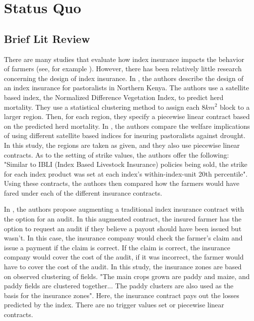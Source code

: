 \documentclass[11pt]{article}
\begin{document}
\section{Status Quo}
  \subsection{Brief Lit Review}
    There are many studies that evaluate how index insurance impacts the behavior of farmers (see, for example \cite{karlan2014agricultural}). However, there has been relatively little research concerning the design of index insurance. In \cite{chantarat2013designing}, the authors describe the design of an index insurance for pastoralists in Northern Kenya. The authors use a satellite based index, the Normalized Difference Vegetation Index, to predict herd mortality. They use a statistical clustering method to assign each $8km^2$ block to a larger region. Then, for each region, they specify a piecewise linear contract based on the predicted herd mortality. In \cite{jensen2019does}, the authors compare the welfare implications of using different satellite based indices for insuring pastoralists against drought. In this study, the regions are taken as given, and they also use piecewise linear contracts. As to the setting of strike values, the authors offer the following: "Similar to IBLI (Index Based Livestock Insurance) policies being sold, the strike for each index product was set at each index's within-index-unit 20th percentile". Using these contracts, the authors then compared how the farmers would have fared under each of the different insurance contracts. 
    
    In \cite{flatnes2018improving}, the authors propose augmenting a traditional index insurance contract with the option for an audit. In this augmented contract, the insured farmer has the option to request an audit if they believe a payout should have been issued but wasn't. In this case, the insurance company would check the farmer's claim and issue a payment if the claim is correct. If the claim is correct, the insurance company would cover the cost of the audit, if it was incorrect, the farmer would have to cover the cost of the audit. In this study, the insurance zones are based on observed clustering of fields. "The main crops grown are paddy and maize, and paddy fields are clustered together... The paddy clusters are also used as the basis for the insurance zones". Here, the insurance contract pays out the losses predicted by the index. There are no trigger values set or piecewise linear contracts. 
\end{document}
